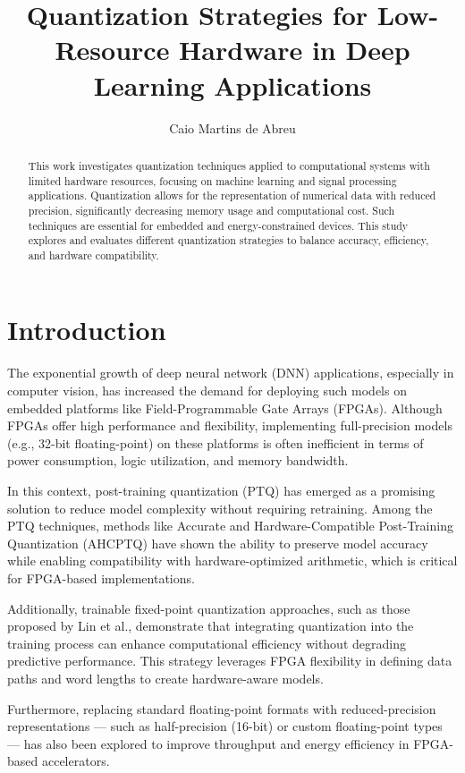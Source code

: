 \documentclass[12pt]{article}
\title{Quantization Strategies for Low-Resource Hardware in Deep Learning Applications}
\author{Caio Martins de Abreu}
\date{}
\begin{document}
\maketitle

\begin{abstract}
This work investigates quantization techniques applied to computational systems with limited hardware resources, focusing on machine learning and signal processing applications. Quantization allows for the representation of numerical data with reduced precision, significantly decreasing memory usage and computational cost. Such techniques are essential for embedded and energy-constrained devices. This study explores and evaluates different quantization strategies to balance accuracy, efficiency, and hardware compatibility.
\end{abstract}

\section{Introduction}

The exponential growth of deep neural network (DNN) applications, especially in computer vision, has increased the demand for deploying such models on embedded platforms like Field-Programmable Gate Arrays (FPGAs). Although FPGAs offer high performance and flexibility, implementing full-precision models (e.g., 32-bit floating-point) on these platforms is often inefficient in terms of power consumption, logic utilization, and memory bandwidth.

In this context, post-training quantization (PTQ) has emerged as a promising solution to reduce model complexity without requiring retraining. Among the PTQ techniques, methods like Accurate and Hardware-Compatible Post-Training Quantization (AHCPTQ) have shown the ability to preserve model accuracy while enabling compatibility with hardware-optimized arithmetic, which is critical for FPGA-based implementations.

Additionally, trainable fixed-point quantization approaches, such as those proposed by Lin et al., demonstrate that integrating quantization into the training process can enhance computational efficiency without degrading predictive performance. This strategy leverages FPGA flexibility in defining data paths and word lengths to create hardware-aware models.

Furthermore, replacing standard floating-point formats with reduced-precision representations — such as half-precision (16-bit) or custom floating-point types — has also been explored to improve throughput and energy efficiency in FPGA-based accelerators.
\end{document}
